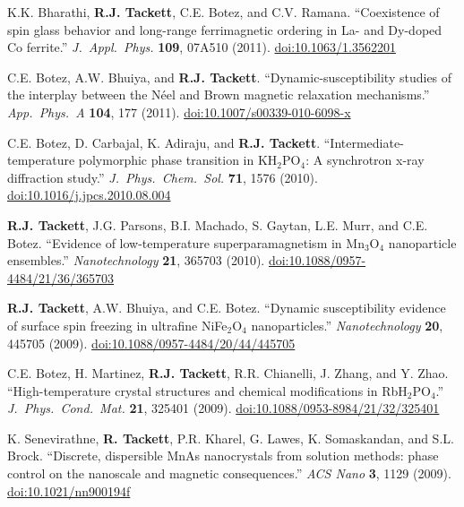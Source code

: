 \documentclass[10pt]{article}
\begin{document}
\begin{reflist}
\item K.K. Bharathi, \textbf{R.J. Tackett}, C.E. Botez, and C.V. Ramana. ``Coexistence of spin glass behavior and long-range ferrimagnetic ordering in La- and Dy-doped Co ferrite.'' \textit{J.\ Appl.\ Phys.} \textbf{109}, 07A510 (2011). \href{https://doi.org/10.1063/1.3562201}{\small\allowbreak doi:10.1063/1.3562201}
\item C.E. Botez, A.W. Bhuiya, and \textbf{R.J. Tackett}. ``Dynamic-susceptibility studies of the interplay between the N\'eel and Brown magnetic relaxation mechanisms.'' \textit{App.\ Phys.\ A} \textbf{104}, 177 (2011). \href{https://doi.org/10.1007/s00339-010-6098-x}{\small\allowbreak doi:10.1007/s00339-010-6098-x}
\item C.E. Botez, D. Carbajal, K. Adiraju, and \textbf{R.J. Tackett}. ``Intermediate-temperature polymorphic phase transition in KH$_2$PO$_4$: A synchrotron x-ray diffraction study.'' \textit{J.\ Phys.\ Chem.\ Sol.} \textbf{71}, 1576 (2010). \href{https://doi.org/10.1016/j.jpcs.2010.08.004}{\small\allowbreak doi:10.1016/j.jpcs.2010.08.004}
\item \textbf{R.J. Tackett}, J.G. Parsons, B.I. Machado, S. Gaytan, L.E. Murr, and C.E. Botez. ``Evidence of low-temperature superparamagnetism in Mn$_3$O$_4$ nanoparticle ensembles.'' \textit{Nanotechnology} \textbf{21}, 365703 (2010). \href{https://doi.org/10.1088/0957-4484/21/36/365703}{\small\allowbreak doi:10.1088/0957-4484/21/36/365703}
\item \textbf{R.J. Tackett}, A.W. Bhuiya, and C.E. Botez. ``Dynamic susceptibility evidence of surface spin freezing in ultrafine NiFe$_2$O$_4$ nanoparticles.'' \textit{Nanotechnology} \textbf{20}, 445705 (2009). \href{https://doi.org/10.1088/0957-4484/20/44/445705}{\small\allowbreak doi:10.1088/0957-4484/20/44/445705}
\item C.E. Botez, H. Martinez, \textbf{R.J. Tackett}, R.R. Chianelli, J. Zhang, and Y. Zhao. ``High-temperature crystal structures and chemical modifications in RbH$_2$PO$_4$.'' \textit{J.\ Phys.\ Cond.\ Mat.} \textbf{21}, 325401 (2009). \href{https://doi.org/10.1088/0953-8984/21/32/325401}{\small\allowbreak doi:10.1088/0953-8984/21/32/325401}
\item K. Senevirathne, \textbf{R. Tackett}, P.R. Kharel, G. Lawes, K. Somaskandan, and S.L. Brock. ``Discrete, dispersible MnAs nanocrystals from solution methods: phase control on the nanoscale and magnetic consequences.'' \textit{ACS Nano} \textbf{3}, 1129 (2009). \href{https://doi.org/10.1021/nn900194f}{\small\allowbreak doi:10.1021/nn900194f}

\end{reflist}
\end{document}
